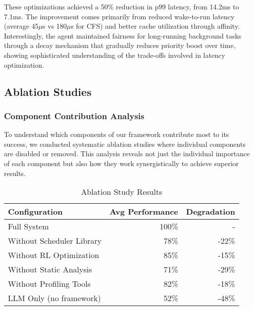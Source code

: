 These optimizations achieved a 50\% reduction in p99 latency, from 14.2ms to 7.1ms. The improvement comes primarily from reduced wake-to-run latency (average 45$\mu$s vs 180$\mu$s for CFS) and better cache utilization through affinity. Interestingly, the agent maintained fairness for long-running background tasks through a decay mechanism that gradually reduces priority boost over time, showing sophisticated understanding of the trade-offs involved in latency optimization.

\subsection{Ablation Studies}

\subsubsection{Component Contribution Analysis}

To understand which components of our framework contribute most to its success, we conducted systematic ablation studies where individual components are disabled or removed. This analysis reveals not just the individual importance of each component but also how they work synergistically to achieve superior results.

\begin{table}[h]
\caption{Ablation Study Results}
\label{tab:ablation}
\begin{tabular}{lrr}
\toprule
Configuration & Avg Performance & Degradation \\
\midrule
Full System & 100\% & - \\
Without Scheduler Library & 78\% & -22\% \\
Without RL Optimization & 85\% & -15\% \\
Without Static Analysis & 71\% & -29\% \\
Without Profiling Tools & 82\% & -18\% \\
LLM Only (no framework) & 52\% & -48\% \\
\bottomrule
\end{tabular}
\end{table}

